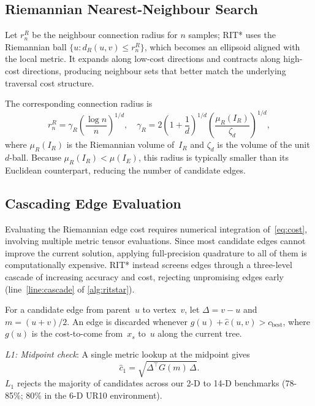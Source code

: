 \documentclass[journal]{IEEEtran}
\newcommand{\revB}[1]{#1}%
\newcommand{\greenrev}[1]{#1}%
\newcommand{\IR}{I_{\!R}}
\newcommand{\IE}{I_{\!E}}
\newcommand{\dR}{d_{\!R}}
\newcommand{\muR}{\mu_{\!R}}
\begin{document}
\subsection{Riemannian Nearest-Neighbour Search}\label{sec:nn}

\revB{Let $r_n^R$ be the neighbour connection radius for $n$ samples;}
RIT* uses the Riemannian ball
$\{u : \dR(u,v) \le r_n^R\}$, which becomes an ellipsoid aligned with
the local metric. It expands along low-cost directions and contracts
along high-cost directions, producing neighbour sets that \greenrev{better match the underlying traversal cost structure.}

The corresponding connection radius is
\begin{equation}\label{eq:radius}
  r_n^R = \gamma_R \!\left(\frac{\log n}{n}\right)^{\!1/d}\!,\quad
  \gamma_R = 2\!\left(1+\frac{1}{d}\right)^{\!1/d}
             \!\left(\frac{\muR(\IR)}{\zeta_d}\right)^{\!1/d},
\end{equation}
where $\muR(\IR)$ is the Riemannian volume of~$\IR$ and $\zeta_d$ is
the volume of the unit $d$-ball. Because $\muR(\IR) < \mu(\IE)$, this
radius is typically smaller than its Euclidean counterpart, reducing the
number of candidate edges.



\subsection{Cascading Edge Evaluation}\label{sec:cascade}

Evaluating the Riemannian edge cost requires numerical integration
of~\eqref{eq:cost}, involving multiple metric tensor evaluations.
Since most candidate edges cannot improve the current solution,
applying full-precision quadrature to all of them is computationally expensive. RIT*
instead screens edges through a three-level cascade of increasing
accuracy and cost, rejecting unpromising edges early
(line~\ref{line:cascade} of \cref{alg:ritstar}).

For a candidate edge from parent~$u$ to vertex~$v$, let
\mbox{$\Delta = v - u$} and $m = (u+v)/2$. An edge is discarded whenever
$g(u) + \hat{c}(u,v) > c_{\mathrm{best}}$, where $g(u)$ is the
cost-to-come from~$x_s$ to~$u$ along the current tree.

\textit{L1: Midpoint check}:
A single metric lookup at the midpoint gives
\begin{equation}\label{eq:l1}
  \hat{c}_1 = \sqrt{\Delta^\top G(m)\,\Delta}.
\end{equation}
$L_1$ rejects the majority of candidates across our
2-D to 14-D benchmarks (78-85\%; 80\% in the \revB{6-D UR10} environment).
\end{document}
